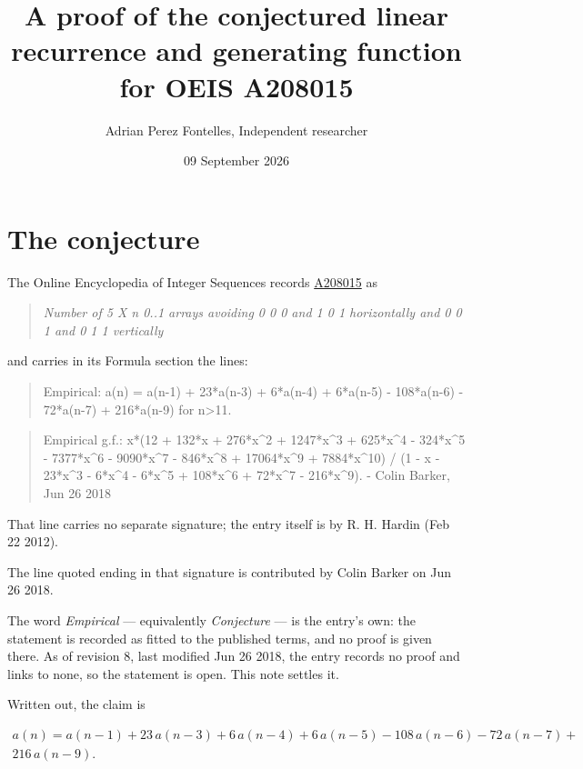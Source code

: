 \documentclass[11pt]{article}
\title{A proof of the conjectured linear recurrence and generating function for OEIS A208015}
\author{Adrian Perez Fontelles, Independent researcher}
\date{09 September 2026}
\theoremstyle{definition}
\begin{document}
\maketitle
\section{The conjecture}

The Online Encyclopedia of Integer Sequences records \href{https://oeis.org/A208015}{A208015} as

\begin{quote}\itshape Number of 5 X n 0..1 arrays avoiding 0 0 0 and 1 0 1 horizontally and 0 0 1 and 0 1 1 vertically\end{quote}

and carries in its Formula section the lines:

\begin{quote}\ttfamily Empirical: a(n) = a(n-1) + 23*a(n-3) + 6*a(n-4) + 6*a(n-5) - 108*a(n-6) - 72*a(n-7) + 216*a(n-9) for n>11.\end{quote}

\begin{quote}\ttfamily Empirical g.f.: x*(12 + 132*x + 276*x\textasciicircum{}2 + 1247*x\textasciicircum{}3 + 625*x\textasciicircum{}4 - 324*x\textasciicircum{}5 - 7377*x\textasciicircum{}6 - 9090*x\textasciicircum{}7 - 846*x\textasciicircum{}8 + 17064*x\textasciicircum{}9 + 7884*x\textasciicircum{}10) / (1 - x - 23*x\textasciicircum{}3 - 6*x\textasciicircum{}4 - 6*x\textasciicircum{}5 + 108*x\textasciicircum{}6 + 72*x\textasciicircum{}7 - 216*x\textasciicircum{}9). - Colin Barker, Jun 26 2018\end{quote}

That line carries no separate signature; the entry itself is by R. H. Hardin (Feb 22 2012).

The line quoted ending in that signature is contributed by Colin Barker on Jun 26 2018.

The word {\itshape Empirical} --- equivalently {\itshape Conjecture} --- is the entry's own: the statement is recorded as fitted to the published terms, and no proof is given there. As of revision 8, last modified Jun 26 2018, the entry records no proof and links to none, so the statement is open. This note settles it.

Written out, the claim is

\begin{multline*} a(n) = a(n-1) + 23\,a(n-3) + 6\,a(n-4) + 6\,a(n-5) - 108\,a(n-6) - 72\,a(n-7) + \\ 216\,a(n-9). \end{multline*}
\end{document}
